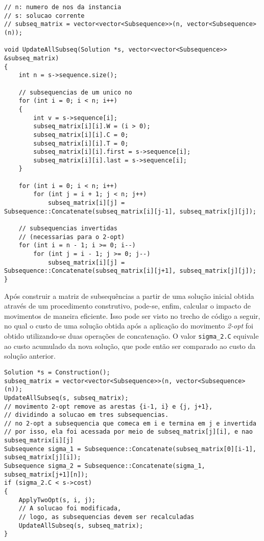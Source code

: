 \begin{lstlisting}[style=cplusplusListStyle]
// n: numero de nos da instancia
// s: solucao corrente
// subseq_matrix = vector<vector<Subsequence>>(n, vector<Subsequence>(n));

void UpdateAllSubseq(Solution *s, vector<vector<Subsequence>> &subseq_matrix)
{
    int n = s->sequence.size();

    // subsequencias de um unico no
    for (int i = 0; i < n; i++)
    {
        int v = s->sequence[i];
        subseq_matrix[i][i].W = (i > 0);
        subseq_matrix[i][i].C = 0;
        subseq_matrix[i][i].T = 0;
        subseq_matrix[i][i].first = s->sequence[i];
        subseq_matrix[i][i].last = s->sequence[i];
    }
    
    for (int i = 0; i < n; i++)
        for (int j = i + 1; j < n; j++)
            subseq_matrix[i][j] = Subsequence::Concatenate(subseq_matrix[i][j-1], subseq_matrix[j][j]);
            
    // subsequencias invertidas
    // (necessarias para o 2-opt)
    for (int i = n - 1; i >= 0; i--)
        for (int j = i - 1; j >= 0; j--)
            subseq_matrix[i][j] = Subsequence::Concatenate(subseq_matrix[i][j+1], subseq_matrix[j][j]);
}
\end{lstlisting}

Após construir a matriz de subsequências a partir de uma solução inicial obtida através de um procedimento construtivo, pode-se, enfim, calcular o impacto de movimentos de maneira eficiente. Isso pode ser visto no trecho de código a seguir, no qual o custo de uma solução obtida após a aplicação do movimento \textit{2-opt} foi obtido utilizando-se duas operações de concatenação. O valor \texttt{sigma\_2.C} equivale ao custo acumulado da nova solução, que pode então ser comparado ao custo da solução anterior.

\begin{lstlisting}[style=cplusplusListStyle]
Solution *s = Construction(); 
subseq_matrix = vector<vector<Subsequence>>(n, vector<Subsequence>(n));
UpdateAllSubseq(s, subseq_matrix);
// movimento 2-opt remove as arestas {i-1, i} e {j, j+1}, 
// dividindo a solucao em tres subsequencias.
// no 2-opt a subsequencia que comeca em i e termina em j e invertida
// por isso, ela foi acessada por meio de subseq_matrix[j][i], e nao subseq_matrix[i][j]
Subsequence sigma_1 = Subsequence::Concatenate(subseq_matrix[0][i-1], subseq_matrix[j][i]);
Subsequence sigma_2 = Subsequence::Concatenate(sigma_1, subseq_matrix[j+1][n]);
if (sigma_2.C < s->cost)
{
    ApplyTwoOpt(s, i, j);
    // A solucao foi modificada,
    // logo, as subsequencias devem ser recalculadas
    UpdateAllSubseq(s, subseq_matrix);
}
\end{lstlisting}

